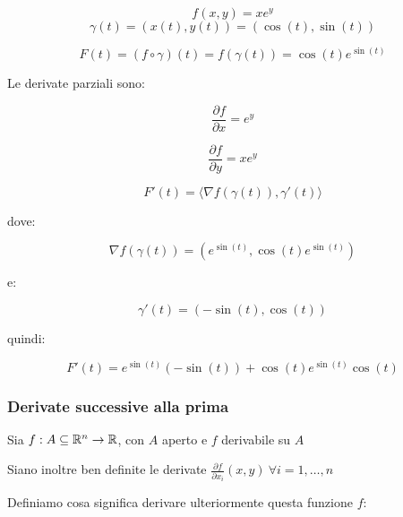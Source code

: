 \[
    f(x,y)= x e ^{y}
\]
\[
    \gamma(t) = (x(t), y(t)) = (\cos (t) , \sin (t))
\]

\[
    F(t) = (f \circ \gamma) (t) = f(\gamma(t)) = \cos (t) e ^{\sin (t)}
\]

Le derivate parziali sono:

\[
    \frac{\partial f}{\partial x} = e ^{y}
\]

\[
    \frac{\partial f}{\partial y} = x e ^{y}
\]

\[
    F'(t) = \langle \nabla f(\gamma(t)), \gamma'(t) \rangle
\]

dove:

\[
    \nabla f(\gamma(t)) = (e ^{\sin (t)}, \cos (t) e ^{\sin (t)})
\]

e:

\[
    \gamma'(t) = (-\sin (t), \cos (t))
\]

quindi:

\[
    F'(t) = e ^{\sin(t)} (- \sin (t)) + \cos (t) e ^{\sin (t)}\cos (t)
\]

\pagebreak
\subsubsection{Derivate successive alla prima}

Sia \(f: A \subseteq \mathbb{R}^{n}  \rightarrow \mathbb{R} \), con \(A\) aperto e \(f\) derivabile su \(A\)

Siano inoltre ben definite le derivate \(\frac{\partial f}{\partial x_i}(x,y) ~\forall i=1,\ldots,n\)

Definiamo cosa significa derivare ulteriormente questa funzione \(f\):


